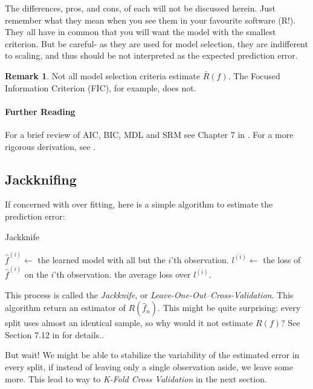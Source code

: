 \documentclass[12pt,a4paper]{article}
\theoremstyle{plain}
\theoremstyle{definition}
\newtheorem{remark}{Remark}
\newcommand{\loss}{l}
\newcommand{\risk}{R}
\newcommand{\hyp}{f}
\newcommand{\test}{\risk(\hyp)}
\newcommand{\insample}{\bar{\risk}(\hyp)}
\newcommand{\EPE}{\risk(\hat{\hyp}_n)}
\begin{document}
The differences, pros, and cons, of each will not be discussed herein. Just remember what they mean when you see them in your favourite software (R!).
They all have in common that you will want the model with the smallest criterion.
But be careful- as they are used for model selection, they are indifferent to scaling, and thus should be not interpreted as the expected prediction error.

\begin{remark}
Not all model selection criteria estimate $\insample$. The Focused Information Criterion (FIC), for example, does not.
\end{remark}





\paragraph{Further Reading}
For a brief review of AIC, BIC, MDL and SRM see Chapter 7 in \citep{hastie_elements_2003}. 
For a more rigorous derivation, see \cite{claeskens_model_2008}.





\subsection{Jackknifing}
\label{sec:jackknife}

If concerned with over fitting, here is a simple algorithm to estimate the prediction error:

\begin{algorithm}[H]
\caption{Jackknife}
\begin{algorithmic}
    \State $\hat{\hyp}^{(i)} \gets$ the learned model with all but the $i$'th observation.
    \State $\loss^{(i)} \gets$ the loss of $\hat{\hyp}^{(i)}$ on the $i$'th observation.
\EndFor
\State \Return the average loss over $\loss^{(i)}$.
\end{algorithmic}
\end{algorithm}

This process is called the \emph{Jackknife}, or \emph{Leave-One-Out--Cross-Validation}. 
This algorithm return an estimator of $\EPE$.
This might be quite surprising: every split uses almost an identical sample, so why would it not estimate $\test$? See Section 7.12 in \cite{hastie_elements_2003} for details..

But wait! We might be able to stabilize the variability of the estimated error in every split, if instead of leaving only a single observation aside, we leave some more. This lead to way to \emph{K-Fold Cross Validation} in the next section.
\end{document}
